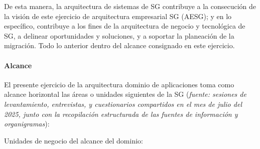 \documentclass[
	a4paper, %
	12pt, %
]{include/CSSullivanBusinessReport}
\begin{document}
De esta manera, la arquitectura de sistemas de SG contribuye a la
consecución de la visión de este ejercicio de arquitectura empresarial
SG (AESG); y en lo específico, contribuye a los fines de la arquitectura
de negocio y tecnológica de SG, a delinear oportunidades y soluciones, y
a soportar la planeación de la migración. Todo lo anterior dentro del
alcance consignado en este ejercicio.

\paragraph{Alcance}\label{sec:alcance}

El presente ejercicio de la arquitectura dominio de aplicaciones toma
como alcance horizontal las áreas o unidades siguientes de la SG
(\emph{fuente: sesiones de levantamiento, entrevistas, y cuestionarios
compartidos en el mes de julio del 2025, junto con la recopilación
estructurada de las fuentes de información y organigramas}):

Unidades de negocio del alcance del dominio:
\end{document}
